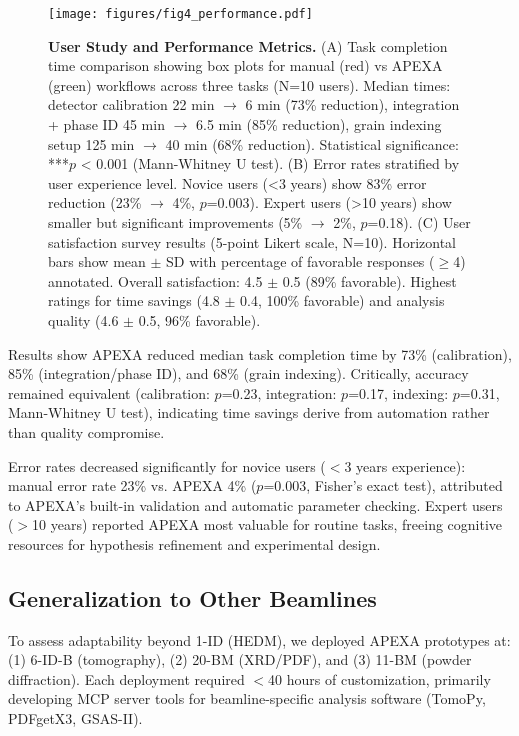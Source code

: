 \documentclass[11pt]{article}
\begin{document}
\begin{figure}[htbp]
\centering
\texttt{[image: figures/fig4\_performance.pdf]}
\caption{\textbf{User Study and Performance Metrics.} (A) Task completion time comparison showing box plots for manual (red) vs APEXA (green) workflows across three tasks (N=10 users). Median times: detector calibration 22 min $\rightarrow$ 6 min (73\% reduction), integration + phase ID 45 min $\rightarrow$ 6.5 min (85\% reduction), grain indexing setup 125 min $\rightarrow$ 40 min (68\% reduction). Statistical significance: ***$p$ < 0.001 (Mann-Whitney U test). (B) Error rates stratified by user experience level. Novice users (<3 years) show 83\% error reduction (23\% $\rightarrow$ 4\%, $p$=0.003). Expert users (>10 years) show smaller but significant improvements (5\% $\rightarrow$ 2\%, $p$=0.18). (C) User satisfaction survey results (5-point Likert scale, N=10). Horizontal bars show mean $\pm$ SD with percentage of favorable responses ($\geq$4) annotated. Overall satisfaction: 4.5 $\pm$ 0.5 (89\% favorable). Highest ratings for time savings (4.8 $\pm$ 0.4, 100\% favorable) and analysis quality (4.6 $\pm$ 0.5, 96\% favorable).}
\label{fig:performance}
\end{figure}

Results show APEXA reduced median task completion time by 73\% (calibration), 85\% (integration/phase ID), and 68\% (grain indexing). Critically, accuracy remained equivalent (calibration: $p$=0.23, integration: $p$=0.17, indexing: $p$=0.31, Mann-Whitney U test), indicating time savings derive from automation rather than quality compromise.

Error rates decreased significantly for novice users ($<$3 years experience): manual error rate 23\% vs. APEXA 4\% ($p$=0.003, Fisher's exact test), attributed to APEXA's built-in validation and automatic parameter checking. Expert users ($>$10 years) reported APEXA most valuable for routine tasks, freeing cognitive resources for hypothesis refinement and experimental design.

\subsection{Generalization to Other Beamlines}

To assess adaptability beyond 1-ID (HEDM), we deployed APEXA prototypes at: (1) 6-ID-B (tomography), (2) 20-BM (XRD/PDF), and (3) 11-BM (powder diffraction). Each deployment required $<$40 hours of customization, primarily developing MCP server tools for beamline-specific analysis software (TomoPy, PDFgetX3, GSAS-II).
\end{document}
